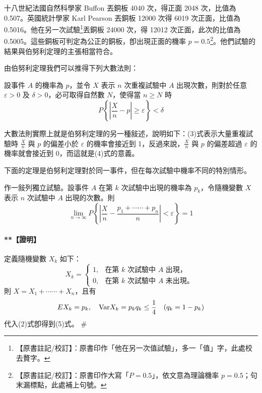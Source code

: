 \medskip
\begin{example}\label{ex:b5s-5-17}
十八世紀法國自然科學家 Buffon 丟銅板 4040 次，得正面 2048 次，比值為 0.507。英國統計學家 Karl Pearson 丟銅板 12000 次得 6019 次正面，比值為 0.5016。他在另一次試驗\label{note:b5s-ch5-p165-extra}\footnote{【原書註記/校訂】：原書印作「他在另一次值試驗」，多一「值」字，此處校去贅字。}丟銅板 24000 次，得 12012 次正面，此次的比值為 0.5005。這些銅板可判定為公正的銅板，卽出現正面的機率 $p = 0.5$\label{note:b5s-ch5-p165-p}\footnote{【原書註記/校訂】：原書印作大寫「$P = 0.5$」，依文意為理論機率 $p = 0.5$；句末漏標點，此處補上句號。}。他們試驗的結果與伯努利定理的主張相當符合。
\end{example}

由伯努利定理我們可以推得下列大數法則：

\medskip
\begin{theorem*}[大數法則]
設事件 $A$ 的機率為 $p$，並令 $X$ 表示 $n$ 次重複試驗中 $A$ 出現次數，則對於任意 $\varepsilon > 0$ 及 $\delta > 0$，必可取得自然數 $N$，使得當 $n \ge N$ 時
\begin{equation}
P\left\{\left|\frac{X}{n} - p\right| \ge \varepsilon\right\} < \delta \tag{4}\label{eq:b5s-5-3-4}
\end{equation}
\end{theorem*}

大數法則實際上就是伯努利定理的另一種敍述，說明如下：(3)式表示大量重複試驗時 $\frac{X}{n}$ 與 $p$ 的偏差小於 $\varepsilon$ 的機率會接近到 1，反過來說，$\frac{X}{n}$ 與 $p$ 的偏差超過 $\varepsilon$ 的機率就會接近到 0，而這就是(4)式的意義。

下面的定理是伯努利定理對於同一事件，但在每次試驗中機率不同的特別情形。

\medskip
\begin{theorem*}
作一敍列獨立試驗。設事件 $A$ 在第 $k$ 次試驗中出現的機率為 $p_k$，令隨機變數 $X$ 表示 $n$ 次試驗中 $A$ 出現的次數。則
\begin{equation}
\lim_{n \to \infty} P\left\{\left|\frac{X}{n} - \frac{p_1 + \cdots\cdots + p_n}{n}\right| < \varepsilon\right\} = 1 \tag{5}\label{eq:b5s-5-3-5}
\end{equation}
\end{theorem*}
\paragraph{**【證明】}
定義隨機變數 $X_k$ 如下：
\[
X_k = \begin{cases} 1, & \text{在第 $k$ 次試驗中 $A$ 出現，} \\ 0, & \text{在第 $k$ 次試驗中 $A$ 未出現。} \end{cases}
\]
則 $X = X_1 + \cdots\cdots + X_n$，且有
\[
EX_k = p_k, \quad \text{Var} X_k = p_k q_k \le \frac{1}{4} \quad (q_k = 1 - p_k)
\]
代入(2)式卽得到(5)式。 \hfill\#


